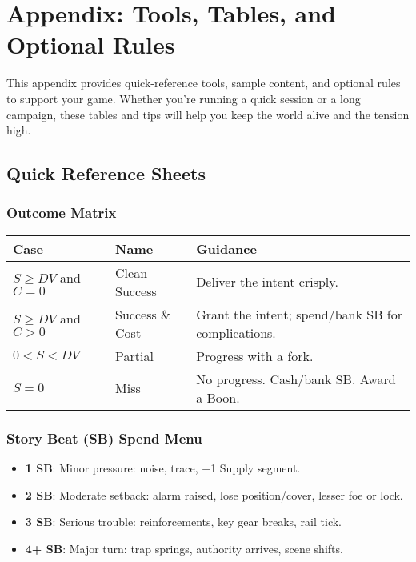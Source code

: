 \chapter{Appendix: Tools, Tables, and Optional Rules}

This appendix provides quick-reference tools, sample content, and optional rules to support your game. Whether you're running a quick session or a long campaign, these tables and tips will help you keep the world alive and the tension high.

\section*{Quick Reference Sheets}

\subsection*{Outcome Matrix}

\begin{center}
\begin{tabular}{lll}
\toprule
\textbf{Case} & \textbf{Name} & \textbf{Guidance} \\
\midrule
$S \geq DV$ and $C = 0$ & Clean Success\index{Clean Success} & Deliver the intent crisply. \\
$S \geq DV$ and $C > 0$ & Success \& Cost\index{Success \& Cost} & Grant the intent; spend/bank SB for complications. \\
$0 < S < DV$ & Partial\index{Partial} & Progress with a fork. \\
$S = 0$ & Miss\index{Miss} & No progress. Cash/bank SB. Award a Boon. \\
\bottomrule
\end{tabular}
\end{center}

\subsection*{Story Beat (SB) Spend Menu}

\begin{itemize}
    \item \textbf{1 SB}: Minor pressure: noise, trace, +1 Supply segment.
    \item \textbf{2 SB}: Moderate setback: alarm raised, lose position/cover, lesser foe or lock.
    \item \textbf{3 SB}: Serious trouble: reinforcements, key gear breaks, rail tick.
    \item \textbf{4+ SB}: Major turn: trap springs, authority arrives, scene shifts.
\end{itemize}

